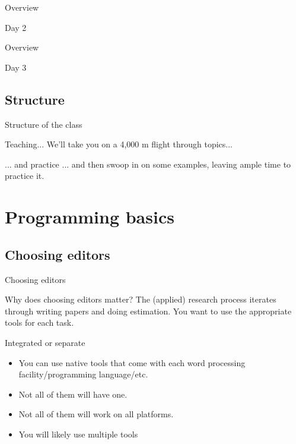 \documentclass[xcolor=table,compress]{beamer}
\begin{document}
\begin{frame}{Overview}
\begin{block}{Day 2}

\end{block}
\end{frame}

\begin{frame}{Overview}
\begin{block}{Day 3}

\end{block}
\end{frame}

\subsection{Structure}

\begin{frame}{Structure of the class}
\begin{block}{Teaching...}
We'll take you on a 4,000 m flight through topics...
\end{block}
\pause
\begin{block}{... and practice}
... and then swoop in on some examples, leaving ample time to practice it.
\end{block}
\end{frame}

\section[Basics]{Programming basics}
\subsection[Editors]{Choosing editors}

\begin{frame}{Choosing editors}
\begin{block}{Why does choosing editors matter?}
The (applied) research process iterates through writing papers and doing estimation. You want to use the appropriate tools for each task.
\end{block}
\begin{block}{Integrated or separate}
\begin{itemize}
\item You can use native tools that come with each word processing facility/programming language/etc. 
\item Not all of them will have one. 
\item Not all of them will work on all platforms.
\item You will likely use multiple tools
\end{itemize}
\end{block}
\end{frame}
\end{document}
